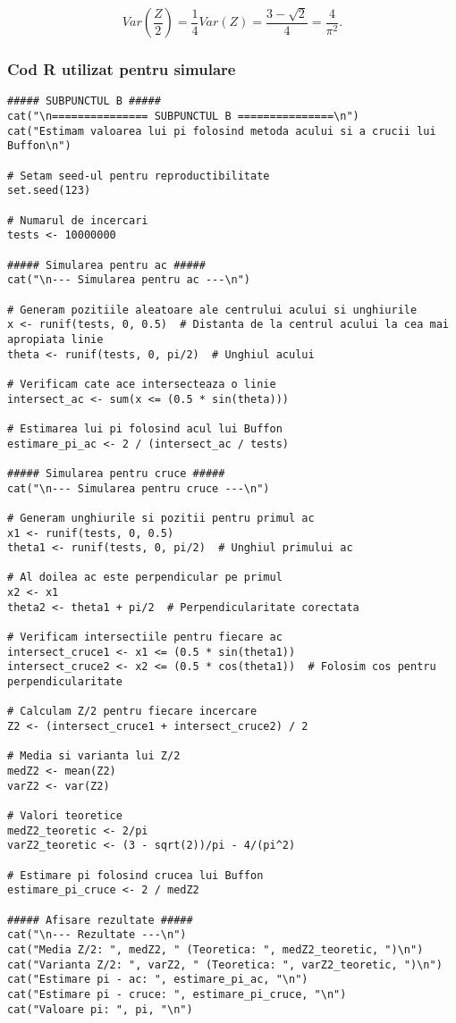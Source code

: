 \documentclass{article}
\begin{document}
\[
Var\left(\frac{Z}{2}\right) = \frac{1}{4} Var(Z) = \frac{3 - \sqrt{2}}{4} = \frac{4}{\pi^2}.
\]

\newpage

\subsubsection*{Cod R utilizat pentru simulare}

\begin{lstlisting}
##### SUBPUNCTUL B #####
cat("\n=============== SUBPUNCTUL B ===============\n")
cat("Estimam valoarea lui pi folosind metoda acului si a crucii lui Buffon\n")

# Setam seed-ul pentru reproductibilitate
set.seed(123)

# Numarul de incercari
tests <- 10000000

##### Simularea pentru ac #####
cat("\n--- Simularea pentru ac ---\n")

# Generam pozitiile aleatoare ale centrului acului si unghiurile
x <- runif(tests, 0, 0.5)  # Distanta de la centrul acului la cea mai apropiata linie
theta <- runif(tests, 0, pi/2)  # Unghiul acului

# Verificam cate ace intersecteaza o linie
intersect_ac <- sum(x <= (0.5 * sin(theta)))

# Estimarea lui pi folosind acul lui Buffon
estimare_pi_ac <- 2 / (intersect_ac / tests)

##### Simularea pentru cruce #####
cat("\n--- Simularea pentru cruce ---\n")

# Generam unghiurile si pozitii pentru primul ac
x1 <- runif(tests, 0, 0.5)
theta1 <- runif(tests, 0, pi/2)  # Unghiul primului ac

# Al doilea ac este perpendicular pe primul
x2 <- x1
theta2 <- theta1 + pi/2  # Perpendicularitate corectata

# Verificam intersectiile pentru fiecare ac
intersect_cruce1 <- x1 <= (0.5 * sin(theta1))
intersect_cruce2 <- x2 <= (0.5 * cos(theta1))  # Folosim cos pentru perpendicularitate

# Calculam Z/2 pentru fiecare incercare
Z2 <- (intersect_cruce1 + intersect_cruce2) / 2

# Media si varianta lui Z/2
medZ2 <- mean(Z2)
varZ2 <- var(Z2)

# Valori teoretice
medZ2_teoretic <- 2/pi
varZ2_teoretic <- (3 - sqrt(2))/pi - 4/(pi^2)

# Estimare pi folosind crucea lui Buffon
estimare_pi_cruce <- 2 / medZ2

##### Afisare rezultate #####
cat("\n--- Rezultate ---\n")
cat("Media Z/2: ", medZ2, " (Teoretica: ", medZ2_teoretic, ")\n")
cat("Varianta Z/2: ", varZ2, " (Teoretica: ", varZ2_teoretic, ")\n")
cat("Estimare pi - ac: ", estimare_pi_ac, "\n")
cat("Estimare pi - cruce: ", estimare_pi_cruce, "\n")
cat("Valoare pi: ", pi, "\n")


\end{lstlisting}
\end{document}
